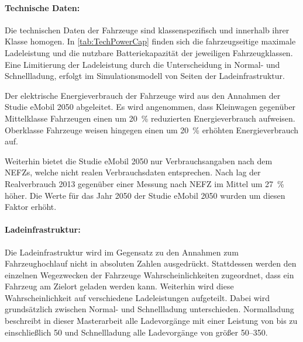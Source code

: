 

\paragraph{Technische Daten:}

Die technischen Daten der Fahrzeuge sind klassenspezifisch und innerhalb ihrer Klasse homogen.
In \autoref{tab:TechPowerCap} finden sich die fahrzeugseitige maximale Ladeleistung und die nutzbare Batteriekapazität der jeweiligen Fahrzeugklassen.
Eine Limitierung der Ladeleistung durch die Unterscheidung in Normal- und Schnellladung, erfolgt im Simulationsmodell von Seiten der Ladeinfrastruktur.



Der elektrische Energieverbrauch der Fahrzeuge wird aus den Annahmen der Studie \glqq eMobil \num{2050}\grqq{} \cite{Hacker2014} abgeleitet.
Es wird angenommen, dass Kleinwagen gegenüber Mittelklasse Fahrzeugen einen um \SI{20}{\percent} reduzierten Energieverbrauch aufweisen.
Oberklasse Fahrzeuge weisen hingegen einen um \SI{20}{\percent} erhöhten Energieverbrauch auf.\medskip

Weiterhin bietet die Studie \glqq eMobil \num{2050}\grqq{} nur Verbrauchsangaben nach dem \glspl{NEFZ}, welche nicht realen Verbrauchsdaten entsprechen.
Nach \cite{Heinfellner2015} lag der Realverbrauch \num{2013} gegenüber einer Messung nach \gls{NEFZ} im Mittel um \SI{27}{\percent} höher.
Die Werte für das Jahr \num{2050} der Studie \glqq eMobil \num{2050}\grqq{} wurden um diesen Faktor erhöht.



\paragraph{Ladeinfrastruktur:}

Die Ladeinfrastruktur wird im Gegensatz zu den Annahmen zum Fahrzeughochlauf nicht in absoluten Zahlen ausgedrückt.
Stattdessen werden den einzelnen Wegezwecken der Fahrzeuge Wahrscheinlichkeiten zugeordnet, dass ein Fahrzeug am Zielort geladen werden kann.
Weiterhin wird diese Wahrscheinlichkeit auf verschiedene Ladeleistungen aufgeteilt.
Dabei wird grundsätzlich zwischen Normal- und Schnellladung unterschieden.
Normalladung beschreibt in dieser Masterarbeit alle Ladevorgänge mit einer Leistung von bis zu einschließlich \SI{50}{\kw} und Schnellladung alle Ladevorgänge von größer \SIrange[range-phrase=~bis~einschließlich~]{50}{350}{\kw}.

